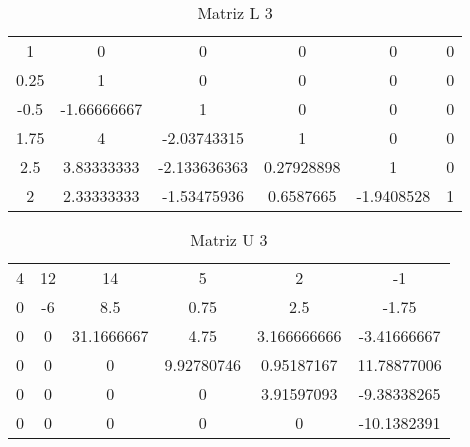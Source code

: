 \documentclass[12pt]{article}
\begin{document}

\begin{table}[!h]
    \centering
    \begin{tabular}{|c c c c c c|}
        1           &         0          &           0                        &   0             &   0      &   0\\
        0.25          &         1           &          0                      &   0             &   0      &   0\\
        -0.5           &         -1.66666667           &          1           &   0             &   0     &   0\\
        1.75           &         4           &           -2.03743315          &   1             &   0       &   0\\
        2.5           &         3.83333333           &           -2.133636363 &   0.27928898    &   1       &   0\\
        2           &         2.33333333           &           -1.53475936    &   0.6587665    &   -1.9408528       &   1\\
    \end{tabular}
    \caption{Matriz L 3}
    \label{tab:esq}
\end{table}

\begin{table}[!h]
    \centering
    \begin{tabular}{|c c c c c c|}
        4           &         12          &           14                        &   5             &   2      &   -1\\
        0          &         -6           &          8.5                      &   0.75             &   2.5      &   -1.75\\
        0           &       0           &          31.1666667           &   4.75             &   3.166666666     &   -3.41666667\\
        0           &         0           &           0          &   9.92780746             &   0.95187167       &   11.78877006\\
        0           &         0           &           0 &   0    &   3.91597093       &   -9.38338265\\
        0           &       0           &           0    &   0    &   0       &   -10.1382391\\
    \end{tabular}
    \caption{Matriz U 3}
    \label{tab:dir}
\end{table}
\end{document}
